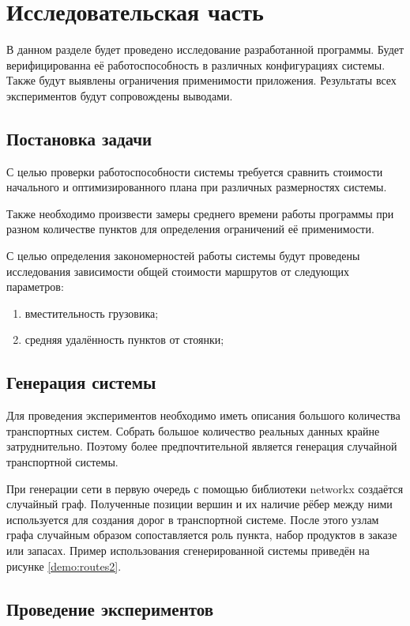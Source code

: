 \section{Исследовательская часть}

В данном разделе будет проведено исследование разработанной программы. Будет верифицированна её работоспособность в различных конфигурациях системы. Также будут выявлены ограничения применимости приложения. Результаты всех экспериментов будут сопровождены выводами.  

\subsection{Постановка задачи}
С целью проверки работоспособности системы требуется сравнить стоимости начального и оптимизированного плана при различных размерностях системы.

Также необходимо произвести замеры среднего времени работы программы при разном количестве пунктов для определения ограничений её применимости.

С целью определения закономерностей работы системы будут проведены исследования зависимости общей стоимости маршрутов от следующих параметров:

\begin{enumerate}
	\item вместительность грузовика;
	\item средняя удалённость пунктов от стоянки;
\end{enumerate}

\subsection{Генерация системы}
Для проведения экспериментов необходимо иметь описания большого количества транспортных систем. Собрать большое количество реальных данных крайне затруднительно. Поэтому более предпочтительной является генерация случайной транспортной системы.

При генерации сети в первую очередь с помощью библиотеки networkx создаётся случайный граф. Полученные позиции вершин и их наличие рёбер между ними используется для создания дорог в транспортной системе. После этого узлам графа случайным образом сопоставляется роль пункта, набор продуктов в заказе или запасах. Пример использования сгенерированной системы приведён на рисунке \ref{demo:routes2}.

\subsection{Проведение экспериментов}

